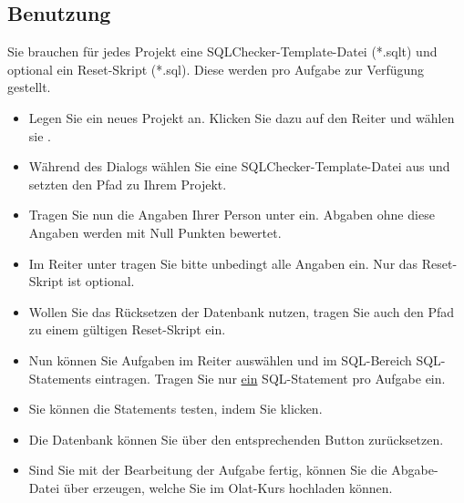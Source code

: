 \documentclass[11pt]{article}
\begin{document}
\subsection{Benutzung}
Sie brauchen für jedes Projekt eine SQLChecker-Template-Datei (*.sqlt) und optional ein Reset-Skript (*.sql). Diese werden pro Aufgabe zur Verfügung gestellt.
\begin{itemize}
	\item Legen Sie ein neues Projekt an. Klicken Sie dazu auf den Reiter  und wählen sie .
	\item Während des Dialogs wählen Sie eine SQLChecker-Template-Datei aus und setzten den Pfad zu Ihrem Projekt.
	\item Tragen Sie nun die Angaben Ihrer Person unter  ein. Abgaben ohne diese Angaben werden mit Null Punkten bewertet.
	\item Im Reiter  unter  tragen Sie bitte unbedingt alle Angaben ein. Nur das Reset-Skript ist optional.
	\item Wollen Sie das Rücksetzen der Datenbank nutzen, tragen Sie auch den Pfad zu einem gültigen Reset-Skript ein.
	\item Nun können Sie Aufgaben im Reiter  auswählen und im SQL-Bereich SQL-Statements eintragen. Tragen Sie nur \underline{ein} SQL-Statement pro Aufgabe ein.
	\item Sie können die Statements testen, indem Sie  klicken.
	\item Die Datenbank können Sie über den entsprechenden Button zurücksetzen.
	\item Sind Sie mit der Bearbeitung der Aufgabe fertig, können Sie die Abgabe-Datei über  erzeugen, welche Sie im Olat-Kurs hochladen können.
\end{itemize}
\end{document}
